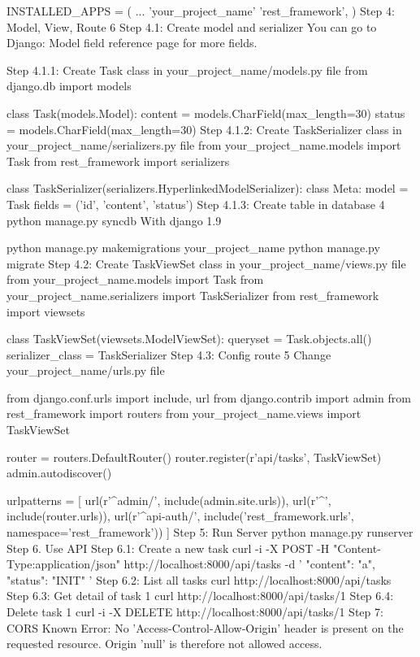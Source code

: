 INSTALLED_APPS = (
    ...
    'your_project_name'
    'rest_framework',
)
Step 4: Model, View, Route 6
Step 4.1: Create model and serializer
You can go to Django: Model field reference page for more fields.

Step 4.1.1: Create Task class in your_project_name/models.py file
from django.db import models

class Task(models.Model):
    content = models.CharField(max_length=30)
    status = models.CharField(max_length=30)
Step 4.1.2: Create TaskSerializer class in your_project_name/serializers.py file
from your_project_name.models import Task
from rest_framework import serializers

class TaskSerializer(serializers.HyperlinkedModelSerializer):
    class Meta:
        model = Task
        fields = ('id', 'content', 'status')
Step 4.1.3: Create table in database 4
python manage.py syncdb
With django 1.9

python manage.py makemigrations your_project_name
python manage.py migrate
Step 4.2: Create TaskViewSet class in your_project_name/views.py file
from your_project_name.models import Task
from your_project_name.serializers import TaskSerializer
from rest_framework import viewsets

class TaskViewSet(viewsets.ModelViewSet):
    queryset = Task.objects.all()
    serializer_class = TaskSerializer
Step 4.3: Config route 5
Change your_project_name/urls.py file

from django.conf.urls import include, url
from django.contrib import admin
from rest_framework import routers
from your_project_name.views import TaskViewSet

router = routers.DefaultRouter()
router.register(r'api/tasks', TaskViewSet)
admin.autodiscover()

urlpatterns = [
    url(r'^admin/', include(admin.site.urls)),
    url(r'^', include(router.urls)),
    url(r'^api-auth/', include('rest_framework.urls', namespace='rest_framework'))
]
Step 5: Run Server
python manage.py runserver
Step 6. Use API
Step 6.1: Create a new task
curl -i -X POST -H "Content-Type:application/json" http://localhost:8000/api/tasks -d '{
  "content": "a",
  "status": "INIT"
}'
Step 6.2: List all tasks
curl http://localhost:8000/api/tasks
Step 6.3: Get detail of task 1
curl http://localhost:8000/api/tasks/1
Step 6.4: Delete task 1
curl -i -X DELETE http://localhost:8000/api/tasks/1
Step 7: CORS
Known Error: No 'Access-Control-Allow-Origin' header is present on the requested resource. Origin 'null' is therefore not allowed access.

